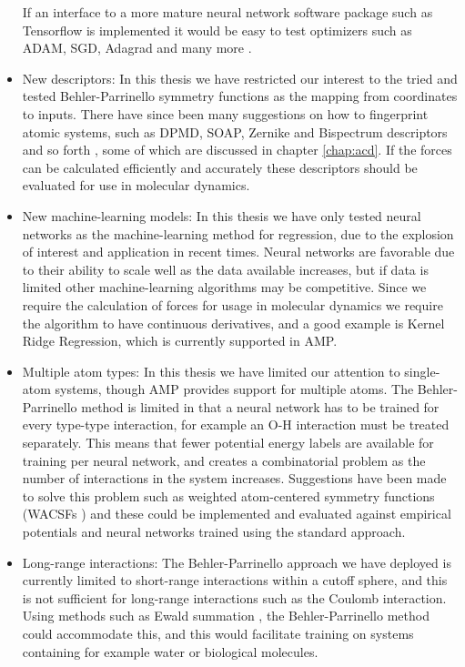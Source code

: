 \begin{itemize}
        If an interface to a more mature neural network software package
        such as Tensorflow is 
        implemented it would be easy to test optimizers such as 
        ADAM, SGD, Adagrad and many more \cite{kingma2014adam}.
    \item New descriptors:
        In this thesis we have restricted our interest to the tried and tested
        Behler-Parrinello symmetry functions as the mapping from
        coordinates to inputs. There have since been many suggestions
        on how to fingerprint atomic systems, such as DPMD, SOAP,
        Zernike and Bispectrum descriptors and so forth
        \cite{PhysRevLett.120.143001, bartok2013representing, khorshidi2016amp},
        some of which are discussed in chapter
        \ref{chap:acd}.
        If the forces can be calculated efficiently and accurately
        these descriptors should be evaluated for use in molecular dynamics.
    \item New machine-learning models:
        In this thesis we have only tested neural networks as the
        machine-learning method for regression, due to the
        explosion of interest and application in recent times.
        Neural networks are favorable due to their ability to scale
        well as the data available increases, but if data is limited
        other machine-learning algorithms may be competitive.
        Since we require the calculation of forces for usage
        in molecular dynamics we require the algorithm to have
        continuous derivatives, and a good example is Kernel Ridge
        Regression, which is currently supported in AMP.
    \item Multiple atom types:
        In this thesis we have limited our attention to single-atom
        systems, though AMP provides support for multiple atoms.
        The Behler-Parrinello method is limited in that a neural network
        has to be trained for every type-type interaction, for example
        an O-H interaction must be treated separately. This means that
        fewer potential energy labels are available for training per neural
        network, and creates a combinatorial problem as the number of interactions
        in the system increases. Suggestions have been made to solve this
        problem such as weighted atom-centered symmetry functions (WACSFs \cite{
            gastegger2018wacsf})
        and these could be implemented and evaluated against
        empirical potentials and neural networks trained using the standard
        approach.
    \item Long-range interactions:
        The Behler-Parrinello approach we have deployed is currently
        limited to short-range interactions within a cutoff sphere,
        and this is not sufficient for long-range interactions such
        as the Coulomb interaction. Using methods such as Ewald summation \cite{
            toukmaji1996ewald},
        the Behler-Parrinello method could accommodate this, and this
        would facilitate training on systems containing for example
        water or biological molecules.
\end{itemize}

